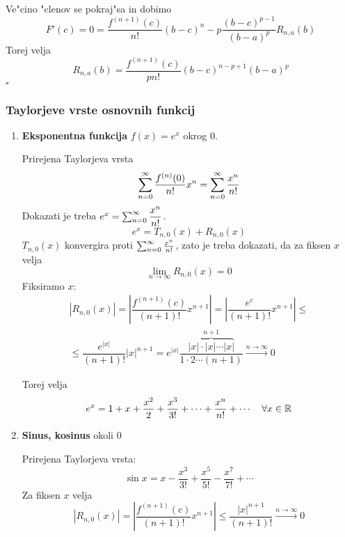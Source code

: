 Ve"cino "clenov se pokraj"sa in dobimo
\begin{equation*}
F'(c) = 0 = \dfrac{f^{(n+1)}(c)}{n!} (b-c)^n - p \dfrac{(b-c)^{p-1}}{(b-a)^p} R_{n, a}(b)
\end{equation*}
Torej velja
\begin{equation*}
R_{n, a}(b) = \dfrac{f^{(n+1)}(c)}{pn!} (b-c)^{n - p + 1} (b-a)^p
\end{equation*}
\hfill $\square$

\subsubsection{Taylorjeve vrste osnovnih funkcij}
\begin{enumerate}
    \item \textbf{Eksponentna funkcija} $f(x) = e^x$ okrog 0.
    
    Prirejena Taylorjeva vrsta
    \begin{equation*}
    \sum_{n = 0}^{\infty} \dfrac{f^{(n)}(0)}{n!} x^n = \sum_{n = 0}^{\infty} \dfrac{x^n}{n!}
    \end{equation*}
    Dokazati je treba $e^x = \sum_{n = 0}^{\infty} \dfrac{x^n}{n!}$.
    \begin{equation*}
    e^x = T_{n, 0}(x) + R_{n, 0} (x)
    \end{equation*}
    $T_{n, 0}(x)$ konvergira proti $\sum_{n = 0}^{\infty} \frac{x^n}{n!}$, zato je treba dokazati, da za fiksen $x$ velja
    \begin{equation*}
    \lim_{n \to \infty} R_{n, 0}(x) = 0
    \end{equation*}
    Fiksiramo $x$:
    \begin{multline*}
      |R_{n, 0}(x)| = \left| \dfrac{f^{(n+1)}(c)}{(n+1)!} x^{n+1} \right| = \left| \dfrac{e^c}{(n+1)!} x^{n+1} \right| \leq \\
      \leq \dfrac{e^{|x|}}{(n+1)!} |x|^{n+1} = e^{|x|} \dfrac{\overbrace{|x| \cdot |x| \cdots |x|}^{n+1}}{1 \cdot 2 \cdots (n+1)} \stackrel{n \to \infty}{\longrightarrow} 0
    \end{multline*}
    
    Torej velja
    \begin{equation*}
    e^x = 1 + x + \dfrac{x^2}{2} + \dfrac{x^3}{3!} + \cdots + \dfrac{x^n}{n!} + \cdots \quad \forall x \in \mathbb{R}
    \end{equation*}
    
    \item \textbf{Sinus, kosinus} okoli 0
    
    Prirejena Taylorjeva vrsta:
    \begin{equation*}
    \sin x = x - \dfrac{x^3}{3!} + \dfrac{x^5}{5!} - \dfrac{x^7}{7!} + \cdots
    \end{equation*}
    Za fiksen $x$ velja
    \begin{equation*}
    |R_{n, 0}(x)| = \left| \dfrac{f^{(n+1)} (c)}{(n+1)!} x^{n+1} \right| \leq \dfrac{|x|^{n+1}}{(n+1)!} \stackrel{n \to \infty}{\longrightarrow} 0
    \end{equation*}
    

\end{enumerate}
